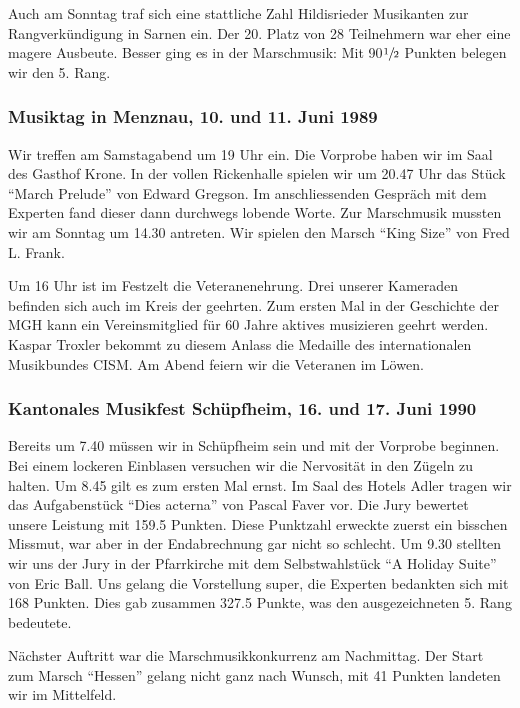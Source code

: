 \begin{history}
    Auch am Sonntag traf sich eine stattliche Zahl Hildisrieder Musikanten zur
    Rangverkündigung in Sarnen ein. Der 20. Platz von 28 Teilnehmern war eher
    eine magere Ausbeute. Besser ging es in der Marschmusik: Mit
    90$\sfrac{1}{2}$ Punkten belegen wir den 5. Rang.


    \subsubsection*{Musiktag in Menznau, 10. und 11. Juni 1989}

    Wir treffen am Samstagabend um 19 Uhr ein. Die Vorprobe haben wir im Saal
    des Gasthof Krone. In der vollen Rickenhalle spielen wir um 20.47 Uhr das
    Stück \enquote{March Prelude} von Edward Gregson. Im anschliessenden
    Gespräch mit dem Experten fand dieser dann durchwegs lobende Worte. Zur
    Marschmusik mussten wir am Sonntag um 14.30 antreten. Wir spielen den Marsch
    \enquote{King Size} von Fred L. Frank.

    Um 16 Uhr ist im Festzelt die Veteranenehrung. Drei unserer Kameraden
    befinden sich auch im Kreis der geehrten. Zum ersten Mal in der Geschichte
    der MGH kann ein Vereinsmitglied für 60 Jahre aktives musizieren geehrt
    werden. Kaspar Troxler bekommt zu diesem Anlass die Medaille des
    internationalen Musikbundes CISM. Am Abend feiern wir die Veteranen im
    Löwen.


    \subsubsection*{Kantonales Musikfest Schüpfheim, 16. und 17. Juni 1990}

    Bereits um 7.40 müssen wir in Schüpfheim sein und mit der Vorprobe beginnen.
    Bei einem lockeren Einblasen versuchen wir die Nervosität in den Zügeln zu
    halten. Um 8.45 gilt es zum ersten Mal ernst. Im Saal des Hotels Adler
    tragen wir das Aufgabenstück \enquote{Dies acterna} von Pascal Faver vor.
    Die Jury bewertet unsere Leistung mit 159.5 Punkten. Diese Punktzahl
    erweckte zuerst ein bisschen Missmut, war aber in der Endabrechnung gar
    nicht so schlecht. Um 9.30 stellten wir uns der Jury in der Pfarrkirche mit
    dem Selbstwahlstück \enquote{A Holiday Suite} von Eric Ball. Uns gelang die
    Vorstellung super, die Experten bedankten sich mit 168 Punkten. Dies gab
    zusammen 327.5 Punkte, was den ausgezeichneten 5. Rang bedeutete.

    Nächster Auftritt war die Marschmusikkonkurrenz am Nachmittag. Der Start zum
    Marsch \enquote{Hessen} gelang nicht ganz nach Wunsch, mit 41 Punkten
    landeten wir im Mittelfeld.


\end{history}
